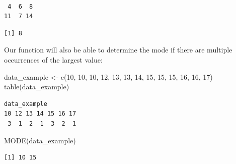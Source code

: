 \documentclass[
  letterpaper,
  DIV=11,
  numbers=noendperiod]{scrreprt}
\newenvironment{Shaded}{\begin{snugshade}}{\end{snugshade}}
\newcommand{\DecValTok}[1]{\textcolor[rgb]{0.68,0.00,0.00}{#1}}
\newcommand{\FunctionTok}[1]{\textcolor[rgb]{0.28,0.35,0.67}{#1}}
\newcommand{\NormalTok}[1]{\textcolor[rgb]{0.00,0.23,0.31}{#1}}
\newcommand{\OtherTok}[1]{\textcolor[rgb]{0.00,0.23,0.31}{#1}}
\newcommand{\SpecialCharTok}[1]{\textcolor[rgb]{0.37,0.37,0.37}{#1}}
\begin{document}
\begin{Shaded}
\end{Shaded}

\begin{verbatim}

 4  6  8 
11  7 14 
\end{verbatim}

\begin{Shaded}
\end{Shaded}

\begin{verbatim}
[1] 8
\end{verbatim}

Our function will also be able to determine the mode if there are
multiple occurrences of the largest value:

\begin{Shaded}
\begin{Highlighting}[]
\NormalTok{data\_example }\OtherTok{\textless{}{-}} \FunctionTok{c}\NormalTok{(}\DecValTok{10}\NormalTok{, }\DecValTok{10}\NormalTok{, }\DecValTok{10}\NormalTok{, }\DecValTok{12}\NormalTok{, }\DecValTok{13}\NormalTok{, }\DecValTok{13}\NormalTok{, }\DecValTok{14}\NormalTok{, }\DecValTok{15}\NormalTok{, }\DecValTok{15}\NormalTok{, }\DecValTok{15}\NormalTok{, }\DecValTok{16}\NormalTok{, }\DecValTok{16}\NormalTok{, }\DecValTok{17}\NormalTok{)}
\FunctionTok{table}\NormalTok{(data\_example)}
\end{Highlighting}
\end{Shaded}

\begin{verbatim}
data_example
10 12 13 14 15 16 17 
 3  1  2  1  3  2  1 
\end{verbatim}

\begin{Shaded}
\begin{Highlighting}[]
\FunctionTok{MODE}\NormalTok{(data\_example)}
\end{Highlighting}
\end{Shaded}

\begin{verbatim}
[1] 10 15
\end{verbatim}
\end{document}
